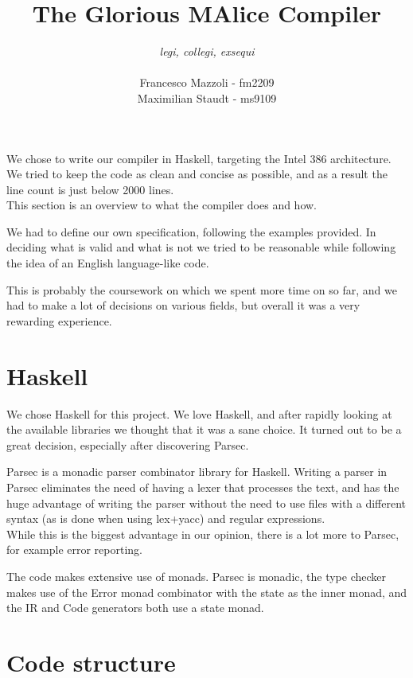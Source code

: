\documentclass[a4paper]{article}
\begin{document}
\title{The Glorious MAlice Compiler}

\author{\emph{legi, collegi, exsequi}\\ \\Francesco Mazzoli - fm2209\\Maximilian Staudt - ms9109}

\maketitle

We chose to write our compiler in Haskell, targeting the Intel 386
architecture. We tried to keep the code as clean and concise as
possible, and as a result the line count is just below 2000 lines.\\
This section is an overview to what the compiler does and how.

We had to define our own specification, following the examples
provided. In deciding what is valid and what is not we tried to
be reasonable while following the idea of an English language-like
code.

This is probably the coursework on which we spent more time on so far,
and we had to make a lot of decisions on various fields, but overall
it was a very rewarding experience.

\section{Haskell}
We chose Haskell for this project. We love Haskell, and after rapidly
looking at the available libraries we thought that it was a sane
choice. It turned out to be a great decision, especially after
discovering Parsec.

Parsec is a monadic parser combinator library for Haskell. Writing a
parser in Parsec eliminates the need of having a lexer that processes
the text, and has the huge advantage of writing the
parser without the need to use files with a different syntax (as is done
when using lex+yacc) and regular expressions.\\ While this
is the biggest advantage in our opinion, there is a lot more to
Parsec, for example error reporting.

The code makes extensive use of monads. Parsec is monadic, the type
checker makes use of the Error monad combinator with the state as the
inner monad, and the IR and Code generators both use a state monad.

\section{Code structure}
\end{document}
